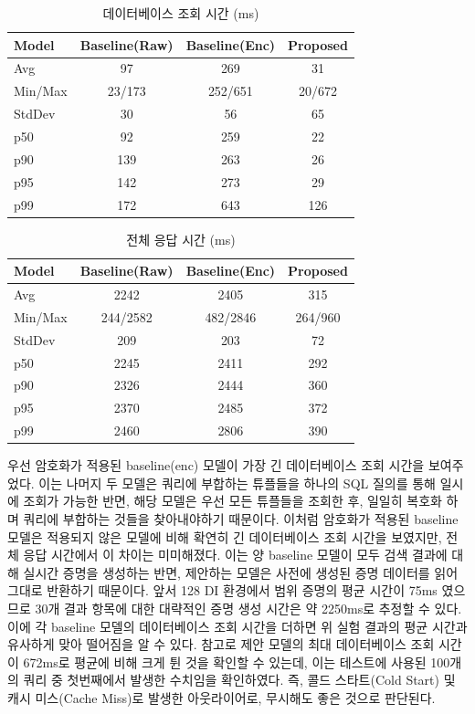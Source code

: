 \begin{table}[h]
    \centering
    \footnotesize
    \caption{데이터베이스 조회 시간 (ms)}
    \begin{tabular}{p{1.5cm}|c|c|c}
        \hline
        Model & Baseline(Raw) & Baseline(Enc) & Proposed \\
        \hline
        Avg & 97 & 269 & 31 \\
        Min/Max & 23/173 & 252/651 & 20/672 \\
        StdDev & 30 & 56 & 65 \\
        p50 & 92 & 259 & 22 \\
        p90 & 139 & 263 & 26 \\
        p95 & 142 & 273 & 29 \\
        p99 & 172 & 643 & 126 \\
        \hline
    \end{tabular}
\end{table}

\begin{table}[h]
    \centering
    \footnotesize
    \caption{전체 응답 시간 (ms)}
    \begin{tabular}{p{1.5cm}|c|c|c}
        \hline
        Model & Baseline(Raw) & Baseline(Enc) & Proposed \\
        \hline
        Avg & 2242 & 2405 & 315 \\
        Min/Max & 244/2582 & 482/2846 & 264/960 \\
        StdDev & 209 & 203 & 72 \\
        p50 & 2245 & 2411 & 292 \\
        p90 & 2326 & 2444 & 360 \\
        p95 & 2370 & 2485 & 372 \\
        p99 & 2460 & 2806 & 390 \\
        \hline
    \end{tabular}
\end{table}

우선 암호화가 적용된 baseline(enc) 모델이 가장 긴 데이터베이스 조회 시간을 보여주었다. 이는 나머지 두 모델은 쿼리에 부합하는 튜플들을 하나의 SQL 질의를 통해 일시에 조회가 가능한 반면, 해당 모델은 우선 모든 튜플들을 조회한 후, 일일히 복호화 하며 쿼리에 부합하는 것들을 찾아내야하기 때문이다. 이처럼 암호화가 적용된 baseline 모델은 적용되지 않은 모델에 비해 확연히 긴 데이터베이스 조회 시간을 보였지만, 전체 응답 시간에서 이 차이는 미미해졌다. 이는 양 baseline 모델이 모두 검색 결과에 대해 실시간 증명을 생성하는 반면, 제안하는 모델은 사전에 생성된 증명 데이터를 읽어 그대로 반환하기 때문이다. 앞서 128 DI 환경에서 범위 증명의 평균 시간이 75ms 였으므로 30개 결과 항목에 대한 대략적인 증명 생성 시간은 약 2250ms로 추정할 수 있다. 이에 각 baseline 모델의 데이터베이스 조회 시간을 더하면 위 실험 결과의 평균 시간과 유사하게 맞아 떨어짐을 알 수 있다. 참고로 제안 모델의 최대 데이터베이스 조회 시간이 672ms로 평균에 비해 크게 튄 것을 확인할 수 있는데, 이는 테스트에 사용된 100개의 쿼리 중 첫번째에서 발생한 수치임을 확인하였다. 즉, 콜드 스타트(Cold Start) 및 캐시 미스(Cache Miss)로 발생한 아웃라이어로, 무시해도 좋은 것으로 판단된다.

